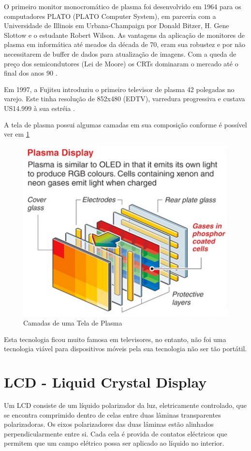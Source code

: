 O primeiro monitor monocromático de plasma foi desenvolvido em 1964 para os computadores PLATO (PLATO Computer System), em parceria com a Universidade de Illinois em Urbana-Champaign por Donald Bitzer, H. Gene Slottow e o estudante Robert Wilson. As vantagens da aplicação de monitores de plasma em informática até meados da década de 70, eram sua robustez e por não necessitarem de buffer de dados para atualização de imagens. Com a queda de preço dos semicondutores (Lei de Moore) os CRTs dominaram o mercado até o final dos anos 90 \cite{WikipediaTelaPlasma}.

Em 1997, a Fujitsu introduziu o primeiro televisor de plasma 42 polegadas no varejo. Este tinha resolução de 852x480 (EDTV), varredura progressiva e custava US14.999 à sua estréia \cite{WikipediaTelaPlasma}.

A tela de plasma possui algumas camadas em sua composição conforme é possível ver em \ref{fig:camadas_plasma}

\begin{figure}[!h]
  \centering
  \includegraphics[width=.40\textwidth]{./figuras/camadas_plasma} 
  \caption{Camadas de uma Tela de Plasma}
  \label{fig:camadas_plasma} 
\end{figure}

Esta tecnologia ficou muito famosa em televisores, no entanto, não foi uma tecnologia viável para dispositivos móveis pela sua tecnologia não ser tão portátil. 


\section{LCD - Liquid Crystal Display}
\label{sec:lcd}

Um LCD consiste de um líquido polarizador da luz, eletricamente controlado, que se encontra comprimido dentro de celas entre duas lâminas transparentes polarizadoras. Os eixos polarizadores das duas lâminas estão alinhados perpendicularmente entre si. Cada cela é provida de contatos eléctricos que permitem que um campo elétrico possa ser aplicado ao líquido no interior.

